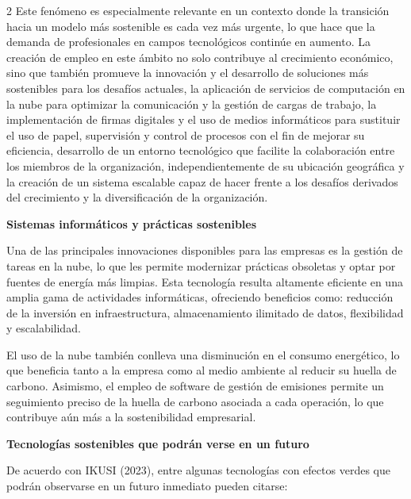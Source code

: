 \documentclass[12pt,spanish,Letterpaper,openany]{book}
\begin{document}
\begin {multicols}{2}
Este fenómeno es especialmente relevante en un contexto donde la transición hacia un modelo más sostenible es cada vez más urgente, lo que hace que la demanda de profesionales en campos tecnológicos continúe en aumento. La creación de empleo en este ámbito no solo contribuye al crecimiento económico, sino que también promueve la innovación y el desarrollo de soluciones más sostenibles para los desafíos actuales, la aplicación de servicios de computación en la nube para optimizar la comunicación y la gestión de cargas de trabajo, la implementación de firmas digitales y el uso de medios informáticos para sustituir el uso de papel, supervisión y control de procesos con el fin de mejorar su eficiencia, desarrollo de un entorno tecnológico que facilite la colaboración entre los miembros de la organización, independientemente de su ubicación geográfica y la creación de un sistema escalable capaz de hacer frente a los desafíos derivados del crecimiento y la diversificación de la organización.

\textbf{Sistemas informáticos y prácticas sostenibles}

Una de las principales innovaciones disponibles para las empresas es la gestión de tareas en la nube, lo que les permite modernizar prácticas obsoletas y optar por fuentes de energía más limpias. Esta tecnología resulta altamente eficiente en una amplia gama de actividades informáticas, ofreciendo beneficios como: reducción de la inversión en infraestructura, almacenamiento ilimitado de datos, flexibilidad y escalabilidad.

El uso de la nube también conlleva una disminución en el consumo energético, lo que beneficia tanto a la empresa como al medio ambiente al reducir su huella de carbono. Asimismo, el empleo de software de gestión de emisiones permite un seguimiento preciso de la huella de carbono asociada a cada operación, lo que contribuye aún más a la sostenibilidad empresarial.

\bigskip
\bigskip
\bigskip

\textbf{Tecnologías sostenibles que podrán verse en un futuro}

De acuerdo con IKUSI (2023), entre algunas tecnologías con efectos verdes que podrán observarse en un futuro inmediato pueden citarse:


\end{multicols}
\end{document}
